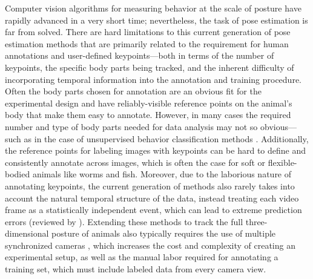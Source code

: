 \documentclass[11pt,a4paper,twoside]{book}
\begin{document}
\begin{doublespace}
Computer vision algorithms for measuring behavior at the scale of posture have rapidly advanced in a very short time; nevertheless, the task of pose estimation is far from solved. There are hard limitations to this current generation of pose estimation methods that are primarily related to the requirement for human annotations and user-defined keypoints---both in terms of the number of keypoints, the specific body parts being tracked, and the inherent difficulty of incorporating temporal information into the annotation and training procedure. Often the body parts chosen for annotation are an obvious fit for the experimental design and have reliably-visible reference points on the animal's body that make them easy to annotate. However, in many cases the required number and type of body parts needed for data analysis may not so obvious---such as in the case of unsupervised behavior classification methods \citep{berman2014mapping, pereira2019fast}. Additionally, the reference points for labeling images with keypoints can be hard to define and consistently annotate across images, which is often the case for soft or flexible-bodied animals like worms and fish. Moreover, due to the laborious nature of annotating keypoints, the current generation of methods also rarely takes into account the natural temporal structure of the data, instead treating each video frame as a statistically independent event, which can lead to extreme prediction errors (reviewed by \citealt{seethapathi2019movement}). Extending these methods to track the full three-dimensional posture of animals also typically requires the use of multiple synchronized cameras \citep{nath2018, gunel2019deepfly3d}, which increases the cost and complexity of creating an experimental setup, as well as the manual labor required for annotating a training set, which must include labeled data from every camera view.


\end{doublespace}
\end{document}
